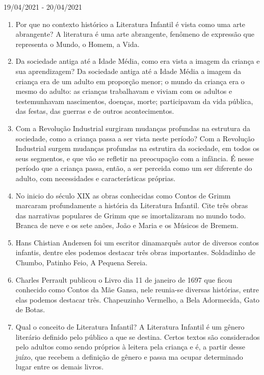 \documentclass{SchoolBook}
\begin{document}
    \begin{day}{19/04/2021 - 20/04/2021}
        \begin{enumerate}
            \item Por que no contexto histórico a Literatura Infantil é vista como uma arte abrangente?
            \response A literatura é uma arte abrangente, fenômeno de expressão que representa o Mundo, o Homem, a Vida.

            \item Da sociedade antiga até a Idade Média, como era vista a imagem da criança e sua aprendizagem?
            \response Da sociedade antiga até a Idade Média a imagem da criança era de um adulto em proporção menor; o mundo da criança era o mesmo do adulto: as crianças trabalhavam e viviam com os adultos e testemunhavam nascimentos, doenças, morte; participavam da vida pública, das festas, das guerras e de outros acontecimentos.

            \item Com a Revolução Industrial surgiram mudanças profundas na estrutura da sociedade, como a criança passa a ser vista neste período?
            \response Com a Revolução Industrial surgem mudanças profundas na estrutira da sociedade, em todos os seus segmentos, e que vão se refletir na preocupação com a infãncia. É nesse período que a criança passa, então, a ser perceida como um ser diferente do adulto, com necessidades e características próprias.

            \item No inicio do século XIX as obras conhecidas como Contos de Grimm marcaram profundamente a história da Literatura Infantil. Cite três obras das narrativas populares de Grimm que se imortalizaram no mundo todo.
            \response Branca de neve e os sete anões, João e Maria e os Músicos de Bremem.

            \item Hans Chistian Andersen foi um escritor dinamarquês autor de diversos contos infantis, dentre eles podemos destacar três obras importantes.
            \response Soldadinho de Chumbo, Patinho Feio, A Pequena Sereia.

            \item Charles Perrault publicou o Livro dia 11 de janeiro de 1697 que ficou conhecido como Contos da Mãe Gansa, nele reunia-se diversas histórias, entre elas podemos destacar três.
            \response Chapeuzinho Vermelho, a Bela Adormecida, Gato de Botas.

            \item Qual o conceito de Literatura Infantil?
            \response A Literatura Infantil é um gênero literário definido pelo público a que se destina. Certos textos são considerados pelo adultos como sendo próprios à leitera pela criança e é, a partir desse juízo, que recebem a definição de gênero e passa ma ocupar determinado lugar entre os demais livros.


\end{enumerate}
\end{day}
\end{document}
